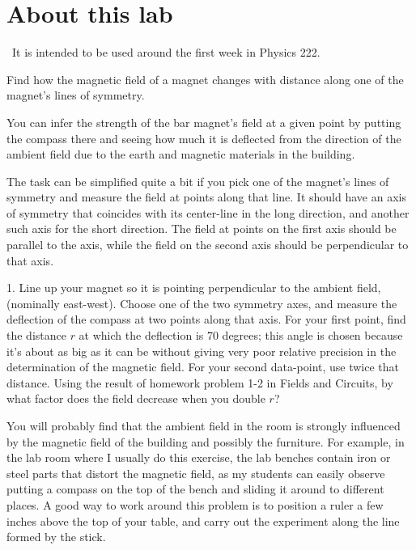 \renewcommand\thechapter{c2.1a}
\label{lab:field-of-a-permanent-magnet}

\section*{About this lab}

\covid\ 
It is intended to be used around the first week in Physics 222.

\apparatus
{}

\begin{goals}

\item[] Find how the magnetic field of a magnet changes with
distance along one of the magnet's lines of symmetry.

\end{goals}

You can infer the strength of the bar magnet's field at a
given point by putting the compass there and seeing how
much it is deflected from the direction of the ambient
field due to the earth and magnetic materials in the building.

The task can be simplified quite a bit if you pick one of the
magnet's lines of symmetry and measure the field at points
along that line. It should have
an axis of symmetry that coincides with its center-line
in the long direction, and another such axis for the short direction.
The field at points on the first axis should be parallel to the axis,
while the field on the second axis should be perpendicular to that axis.

1. Line up your magnet so it is pointing perpendicular to the ambient field,
(nominally east-west). Choose one
of the two symmetry axes, and measure the
deflection of the compass at two points along that axis.
For your first point, find the
distance $r$ at which the deflection is 70 degrees; this angle is chosen because
it's about as big as it can be without giving very poor relative precision 
in the determination of the magnetic field. For your second data-point,
use twice that distance. Using the result of homework problem 
1-2 in Fields and Circuits, by what factor does the field decrease
when you double $r$?

You will probably find that the ambient field in the room is strongly
influenced by the magnetic field of the building and possibly the
furniture.  For example, in the lab room where I usually do this
exercise, the lab benches contain iron or steel parts that distort the
magnetic field, as my students can easily observe putting a compass on
the top of the bench and sliding it around to different places. 
A good way to work around this problem is to position a ruler a few 
inches above the top of your table, and carry out the experiment along the line
formed by the stick.

